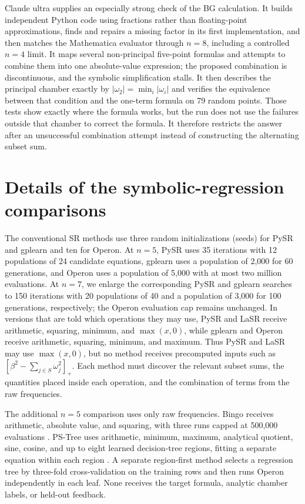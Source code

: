 \documentclass{article}
\begin{document}
Claude ultra supplies an especially strong check of the BG calculation. It
builds independent Python code using fractions rather
than floating-point approximations, finds and repairs a missing factor in its
first implementation, and then matches the Mathematica evaluator through
$n=8$, including a controlled $n=4$ limit. It maps several non-principal
five-point formulas and attempts to combine them into one absolute-value
expression; the proposed combination is discontinuous, and the symbolic
simplification stalls. It then describes the principal
chamber exactly by $|\omega_2|=\min_i|\omega_i|$ and verifies the equivalence
between that condition and the one-term formula on 79 random points. Those tests
show exactly where the formula works, but the run does not use the failures
outside that chamber to correct the formula. It therefore restricts the answer
after an unsuccessful combination attempt instead
of constructing the alternating subset sum.

\section{Details of the symbolic-regression comparisons}
\label{app:sr-diagnostics}

The conventional SR methods use three random initializations (seeds) for
PySR and gplearn and ten for Operon. At $n=5$, PySR uses 35 iterations with 12
populations of 24 candidate equations, gplearn
uses a population of 2,000 for 60 generations, and Operon uses a population of
5,000 with at most two million evaluations. At $n=7$, we enlarge the corresponding PySR
and gplearn searches to 150 iterations with 20 populations of 40
and a population of 3,000 for 100 generations, respectively; the Operon
evaluation cap remains unchanged. In versions that are told which operations
they may use, PySR and LaSR receive arithmetic, squaring, minimum, and
$\max(x,0)$, while gplearn and Operon receive arithmetic, squaring, minimum,
and maximum. Thus PySR and LaSR may use $\max(x,0)$, but no
method receives precomputed inputs such as
$[\beta^2-\sum_{j\in S}\omega_j^2]_+$. Each method must discover the relevant
subset sums, the quantities placed inside each operation, and the combination of terms from the raw
frequencies.

The additional $n=5$ comparison uses only raw frequencies. Bingo receives
arithmetic, absolute value, and squaring, with three runs capped at 500,000
evaluations \citep{Randall2022Bingo}. PS-Tree uses arithmetic, minimum,
maximum, analytical quotient, sine, cosine, and up to eight learned
decision-tree regions, fitting a separate equation within each region
\citep{Zhang2022PSTree}. A separate region-first method selects a regression
tree by three-fold cross-validation on the
training rows and then runs Operon independently in each leaf. None receives
the target formula, analytic chamber labels, or held-out feedback.
\end{document}
